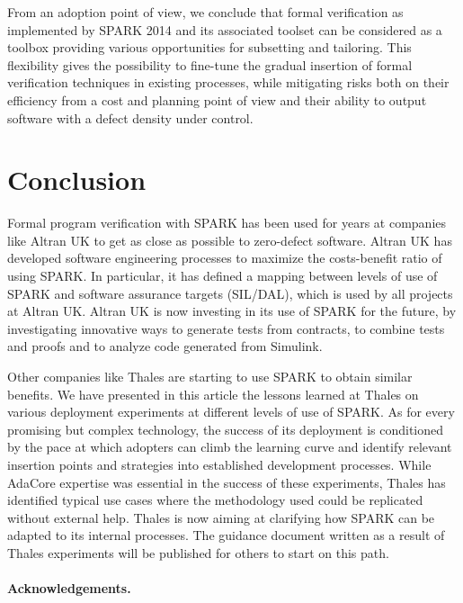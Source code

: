 \documentclass{llncs}
\begin{document}
From an adoption point of view, we conclude that formal verification as
implemented by SPARK 2014 and its associated toolset can be considered as a
toolbox providing various opportunities for subsetting and tailoring. This
flexibility gives the possibility to fine-tune the gradual insertion of formal
verification techniques in existing processes, while mitigating risks both on
their efficiency from a cost and planning point of view and their ability to
output software with a defect density under control.

\section{Conclusion}

Formal program verification with SPARK has been used for years at companies
like Altran UK to get as close as possible to zero-defect software. Altran UK
has developed software engineering processes to maximize the costs-benefit
ratio of using SPARK. In particular, it has defined a mapping between levels of
use of SPARK and software assurance targets (SIL/DAL), which is used by all
projects at Altran UK. Altran UK is now investing in its use of SPARK for the
future, by investigating innovative ways to generate tests from contracts, to
combine tests and proofs and to analyze code generated from Simulink.

Other companies like Thales are starting to use SPARK to obtain similar
benefits. We have presented in this article the lessons learned at Thales on
various deployment experiments at different levels of use of SPARK. As for
every promising but complex technology, the success of its deployment is
conditioned by the pace at which adopters can climb the learning curve and
identify relevant insertion points and strategies into established development
processes. While AdaCore expertise was essential in the success of these
experiments, Thales has identified typical use cases where the methodology used
could be replicated without external help. Thales is now aiming at clarifying
how SPARK can be adapted to its internal processes. The guidance document
written as a result of Thales experiments will be published for others to start
on this path.

\paragraph*{Acknowledgements.}



\end{document}
